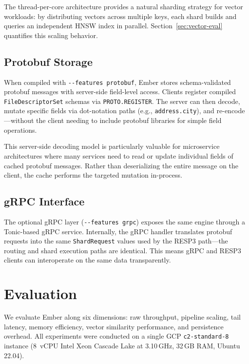 \documentclass[conference]{IEEEtran}
\begin{document}
The thread-per-core architecture provides a natural sharding
strategy for vector workloads: by distributing vectors across
multiple keys, each shard builds and queries an independent HNSW
index in parallel. Section~\ref{sec:vector-eval} quantifies this
scaling behavior.

\subsection{Protobuf Storage}

When compiled with \texttt{-{}-features protobuf}, Ember stores
schema-validated protobuf messages with server-side field-level
access. Clients register compiled \texttt{FileDescriptorSet} schemas
via \texttt{PROTO.REGISTER}. The server can then decode, mutate
specific fields via dot-notation paths (e.g.,
\texttt{address.city}), and re-encode---without the client needing
to include protobuf libraries for simple field operations.

This server-side decoding model is particularly valuable for
microservice architectures where many services need to read or update
individual fields of cached protobuf messages. Rather than
deserializing the entire message on the client, the cache performs
the targeted mutation in-process.

\subsection{gRPC Interface}

The optional gRPC layer (\texttt{-{}-features grpc}) exposes the
same engine through a Tonic-based gRPC service. Internally, the
gRPC handler translates protobuf requests into the same
\texttt{ShardRequest} values used by the RESP3 path---the routing
and shard execution paths are identical. This means gRPC and RESP3
clients can interoperate on the same data transparently.


\section{Evaluation}
\label{sec:eval}

We evaluate Ember along six dimensions: raw throughput, pipeline
scaling, tail latency, memory efficiency, vector similarity
performance, and persistence overhead. All experiments were conducted
on a single GCP \texttt{c2-standard-8} instance (8~vCPU Intel Xeon
Cascade Lake at 3.10\,GHz, 32\,GB RAM, Ubuntu 22.04).
\end{document}

